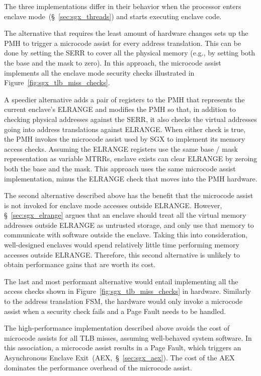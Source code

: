 The three implementations differ in their behavior when the processor enters
enclave mode~(\S~\ref{sec:sgx_threads}) and starts executing enclave code.

The alternative that requires the least amount of hardware changes sets up the
PMH to trigger a microcode assist for every address translation. This can be
done by setting the SERR to cover all the physical memory (e.g., by setting
both the base and the mask to zero). In this approach, the microcode assist
implements all the enclave mode security checks illustrated in
Figure~\ref{fig:sgx_tlb_miss_checks}.

A speedier alternative adds a pair of registers to the PMH that represents the
current enclave's ELRANGE and modifies the PMH so that, in addition to checking
physical addresses against the SERR, it also checks the virtual addresses
going into address translations against ELRANGE. When either check is true, the
PMH invokes the microcode assist used by SGX to implement its memory access
checks. Assuming the ELRANGE registers use the same base / mask representation
as variable MTRRs, enclave exists can clear ELRANGE by zeroing both the base
and the mask. This approach uses the same microcode assist implementation,
minus the ELRANGE check that moves into the PMH hardware.

The second alternative described above has the benefit that the microcode
assist is not invoked for enclave mode accesses outside ELRANGE. However,
\S~\ref{sec:sgx_elrange} argues that an enclave should treat all the virtual
memory addresses outside ELRANGE as untrusted storage, and only use that memory
to communicate with software outside the enclave. Taking this into
consideration, well-designed enclaves would spend relatively little time
performing memory accesses outside ELRANGE. Therefore, this second alternative
is unlikely to obtain performance gains that are worth its cost.

The last and most performant alternative would entail implementing all the
access checks shown in Figure~\ref{fig:sgx_tlb_miss_checks} in hardware.
Similarly to the address translation FSM, the hardware would only invoke a
microcode assist when a security check fails and a Page Fault needs to be
handled.

The high-performance implementation described above avoids the cost of
microcode assists for all TLB misses, assuming well-behaved system software.
In this association, a microcode assist results in a Page Fault, which triggers
an Asynchronous Enclave Exit~(AEX,~\S~\ref{sec:sgx_aex}). The cost of the AEX
dominates the performance overhead of the microcode assist.

